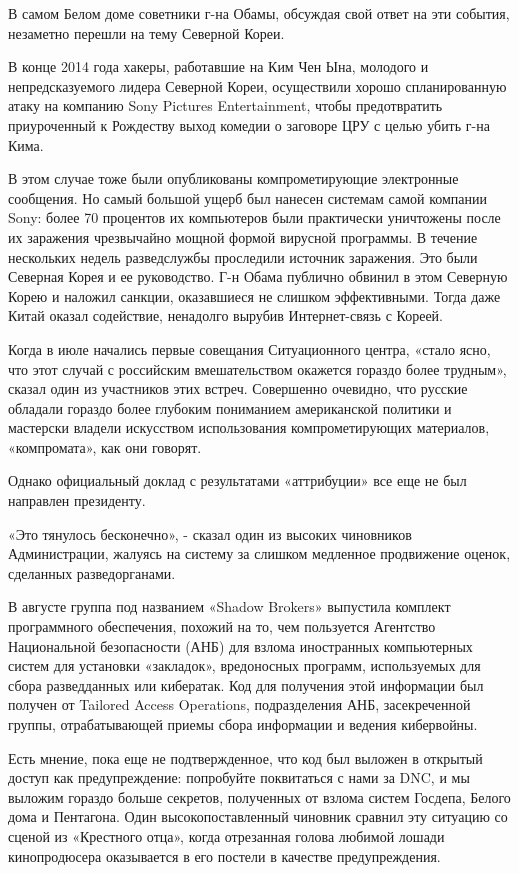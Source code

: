 В самом Белом доме советники г-на Обамы, обсуждая свой ответ на эти
события, незаметно перешли на тему Северной Кореи.

В конце 2014 года хакеры, работавшие на Ким Чен Ына, молодого и
непредсказуемого лидера Северной Кореи, осуществили хорошо
спланированную атаку на компанию Sony Pictures Entertainment, чтобы
предотвратить приуроченный к Рождеству выход комедии о заговоре ЦРУ с
целью убить г-на Кима.

В этом случае тоже были опубликованы компрометирующие электронные
сообщения. Но самый большой ущерб был нанесен системам самой компании
Sony: более 70 процентов их компьютеров были практически уничтожены
после их заражения чрезвычайно мощной формой вирусной программы. В
течение нескольких недель разведслужбы проследили источник заражения.
Это были Северная Корея и ее руководство. Г-н Обама публично обвинил в
этом Северную Корею и наложил санкции, оказавшиеся не слишком
эффективными. Тогда даже Китай оказал содействие, ненадолго вырубив
Интернет-связь с Кореей.

Когда в июле начались первые совещания Ситуационного центра, «стало
ясно, что этот случай с российским вмешательством окажется гораздо более
трудным», сказал один из участников этих встреч. Совершенно очевидно,
что русские обладали гораздо более глубоким пониманием американской
политики и мастерски владели искусством использования компрометирующих
материалов, «компромата», как они говорят.

Однако официальный доклад с результатами «аттрибуции» все еще не был
направлен президенту.

«Это тянулось бесконечно», - сказал один из высоких чиновников
Администрации, жалуясь на систему за слишком медленное продвижение
оценок, сделанных разведорганами.

В августе группа под названием «Shadow Brokers» выпустила комплект
программного обеспечения, похожий на то, чем пользуется Агентство
Национальной безопасности (АНБ) для взлома иностранных компьютерных
систем для установки «закладок», вредоносных программ, используемых для
сбора разведданных или кибератак. Код для получения этой информации был
получен от Tailored Access Operations, подразделения АНБ, засекреченной
группы, отрабатывающей приемы сбора информации и ведения кибервойны.

Есть мнение, пока еще не подтвержденное, что код был выложен в открытый
доступ как предупреждение: попробуйте поквитаться с нами за DNC, и мы
выложим гораздо больше секретов, полученных от взлома систем Госдепа,
Белого дома и Пентагона. Один высокопоставленный чиновник сравнил эту
ситуацию со сценой из «Крестного отца», когда отрезанная голова любимой
лошади кинопродюсера оказывается в его постели в качестве
предупреждения.


